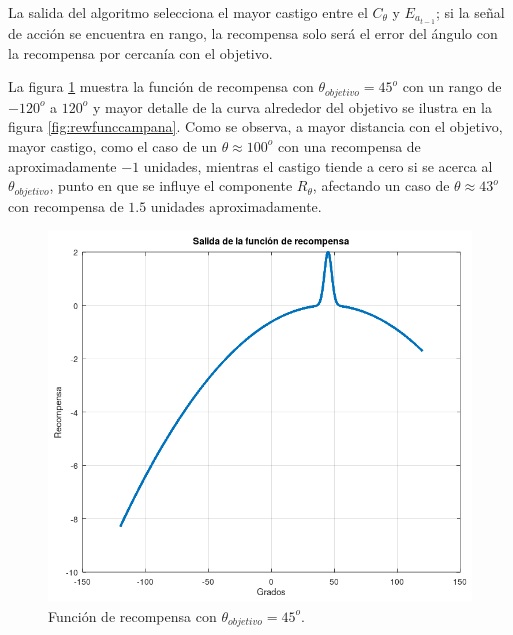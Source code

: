 La salida del algoritmo selecciona el mayor castigo entre el $C_{\theta}$ y $E_{a_{t-1}}$; si la señal de acción se encuentra en rango, la recompensa solo será el error del ángulo con la recompensa por cercanía con el objetivo.

La figura \ref{fig:rewfunc} muestra la función de recompensa con $\theta_{objetivo} = 45^o$ con un rango de $-120^o$ a $120^o$ y mayor detalle de la curva alrededor del objetivo se ilustra en la figura \ref{fig:rewfunccampana}. Como se observa, a mayor distancia con el objetivo, mayor castigo, como el caso de un $\theta \approx 100^o$ con una recompensa de aproximadamente $-1$ unidades, mientras el castigo tiende a cero si se acerca al $\theta_{objetivo}$, punto en que se influye el componente $R_{\theta}$, afectando un caso de $\theta \approx 43^o$ con recompensa de $1.5$ unidades aproximadamente.
\begin{figure}[hh]
	\centering
	\includegraphics[scale=0.4]{fig/new/Rewardfunc.png}
	\caption{Función de recompensa con $\theta_{objetivo}=45^o$.}
	\label{fig:rewfunc}
\end{figure}

